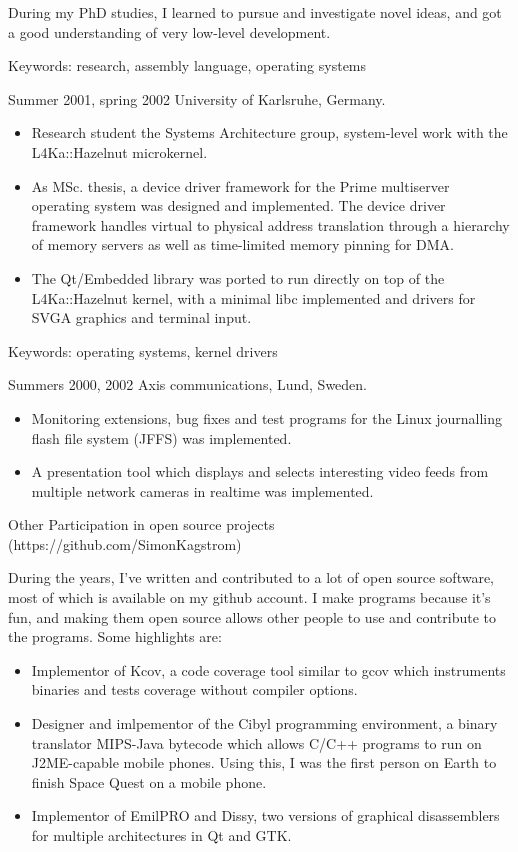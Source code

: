 \documentclass[a4paper]{article}
\begin{document}
\begin{CV}
During my PhD studies, I learned to pursue and investigate novel ideas, and
got a good understanding of very low-level development.

Keywords: research, assembly language, operating systems

\item[Summer 2001, spring 2002] University of Karlsruhe, Germany.
  \begin{itemize}
  \item Research student the Systems Architecture group, system-level work
    with the L4Ka::Hazelnut microkernel.
  \item As MSc. thesis, a device driver framework for the Prime multiserver
    operating system was designed and implemented. The device driver framework
    handles virtual to physical address translation through a hierarchy of
    memory servers as well as time-limited memory pinning for DMA.
  \item The Qt/Embedded library was ported to run directly on top of the
    L4Ka::Hazelnut kernel, with a minimal libc implemented and drivers for
    SVGA graphics and terminal input.
  \end{itemize}

Keywords: operating systems, kernel drivers


\item[Summers 2000, 2002] Axis communications, Lund, Sweden.
  \begin{itemize}
  \item Monitoring extensions, bug fixes and test programs for the Linux journalling
    flash file system (JFFS) was implemented.
  \item A presentation tool which displays and selects interesting video feeds
    from multiple network cameras in realtime was implemented.
  \end{itemize}

\item[Other] Participation in open source projects (https://github.com/SimonKagstrom)

During the years, I've written and contributed to a lot of open source software, most
of which is available on my github account. I make programs because it's fun, and making
them open source allows other people to use and contribute to the programs. Some highlights
are:

  \begin{itemize}
    \item Implementor of Kcov, a code coverage tool similar to gcov
      which instruments binaries and tests coverage without compiler
      options.
    \item Designer and imlpementor of the Cibyl programming environment, a
      binary translator MIPS-Java bytecode which allows C/C++ programs
      to run on J2ME-capable mobile phones. Using this, I was the first person
      on Earth to finish Space Quest on a mobile phone.
    \item Implementor of EmilPRO and Dissy, two versions of graphical disassemblers for
      multiple architectures in Qt and GTK.
  \end{itemize}
\end{CV}
\end{document}
